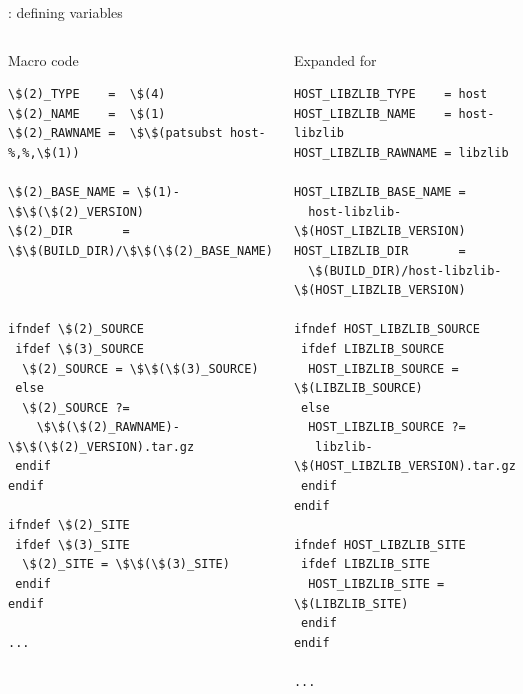 \begin{frame}[fragile]{: defining variables}

\begin{columns}

\begin{block}{Macro code}
\begin{verbatim}
\$(2)_TYPE    =  \$(4)
\$(2)_NAME    =  \$(1)
\$(2)_RAWNAME =  \$\$(patsubst host-%,%,\$(1))

\$(2)_BASE_NAME = \$(1)-\$\$(\$(2)_VERSION)
\$(2)_DIR       = \$\$(BUILD_DIR)/\$\$(\$(2)_BASE_NAME)



ifndef \$(2)_SOURCE
 ifdef \$(3)_SOURCE
  \$(2)_SOURCE = \$\$(\$(3)_SOURCE)
 else
  \$(2)_SOURCE ?=
    \$\$(\$(2)_RAWNAME)-\$\$(\$(2)_VERSION).tar.gz
 endif
endif

ifndef \$(2)_SITE
 ifdef \$(3)_SITE
  \$(2)_SITE = \$\$(\$(3)_SITE)
 endif
endif

...
\end{verbatim}
\end{block}

\begin{block}{Expanded for }
\begin{verbatim}
HOST_LIBZLIB_TYPE    = host
HOST_LIBZLIB_NAME    = host-libzlib
HOST_LIBZLIB_RAWNAME = libzlib

HOST_LIBZLIB_BASE_NAME =
  host-libzlib-\$(HOST_LIBZLIB_VERSION)
HOST_LIBZLIB_DIR       =
  \$(BUILD_DIR)/host-libzlib-\$(HOST_LIBZLIB_VERSION)

ifndef HOST_LIBZLIB_SOURCE
 ifdef LIBZLIB_SOURCE
  HOST_LIBZLIB_SOURCE = \$(LIBZLIB_SOURCE)
 else
  HOST_LIBZLIB_SOURCE ?=
   libzlib-\$(HOST_LIBZLIB_VERSION).tar.gz
 endif
endif

ifndef HOST_LIBZLIB_SITE
 ifdef LIBZLIB_SITE
  HOST_LIBZLIB_SITE = \$(LIBZLIB_SITE)
 endif
endif

...
\end{verbatim}
\end{block}

\end{columns}

\end{frame}

